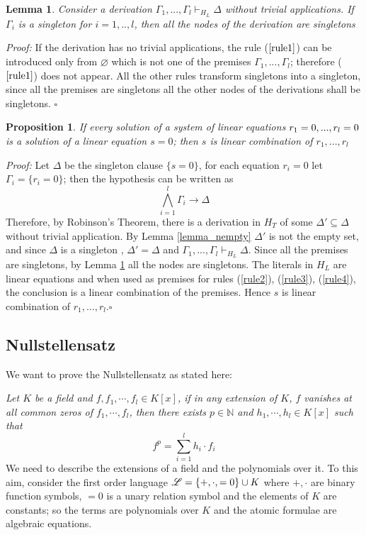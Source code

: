 \documentclass[a4paper,12pt,oneside]{book}
\newtheorem{proposition}[theorem]{Proposition}
\newtheorem{lemma}[theorem]{Lemma}
\newcommand*{\QED}{\hfill\ensuremath{\square}}
\let\emptyset\varnothing
\begin{document}
\begin{lemma}\label{lemma_onlysingletons}
Consider a derivation $\Gamma_1,...,\Gamma_l \vdash_{H_L} \Delta $ without trivial applications. 
If $\Gamma_i$ is a singleton for $i=1,..,l$, then all the nodes of the derivation are singletons
\end{lemma}
\textit{Proof:} If the derivation has no trivial applications, the rule ($\ref{rule1}$) can be introduced only from $\emptyset$ which is not one of the premises $\Gamma_1,...,\Gamma_l$; therefore ($\ref{rule1}$)  does not appear. All the other rules transform singletons into a singleton, since all the premises are singletons all the other nodes of the derivations shall be singletons. \QED

\begin{proposition} 
If every solution of a system of linear equations $r_1=0,...,r_l=\nobreak 0$  is a solution of a linear equation $s=0$; then $s$ is linear combination of $r_1,...,r_l$
\end{proposition}

\textit{Proof:} Let $\Delta$ be the singleton clause $\{s=0\}$, for each equation $r_i=0$  let $\Gamma_i=\{r_i=0\}$; then the hypothesis can be written as
$$ \bigwedge_{i=1}^l \Gamma_i \rightarrow \Delta $$
Therefore, by Robinson's Theorem, there is a derivation in $H_T$ of some $\Delta' \subseteq\Delta$ without trivial application. By Lemma \ref{lemma_nempty} $\Delta'$ is not the empty set,  and  since $\Delta$ is a singleton , $\Delta'=\Delta$ and $ \Gamma_1,...,\Gamma_l \vdash_{H_L} \Delta  $.
Since all the premises are singletons, by Lemma \ref{lemma_onlysingletons} all the nodes are singletons. The literals in $H_L$ are linear equations and when used as premises for rules (\ref{rule2}), (\ref{rule3}), (\ref{rule4}), the conclusion is a linear combination of the premises. 
Hence $s$ is linear combination of $r_1,...,r_l$.\QED


\subsection*{Nullstellensatz} \label{null}


We want to prove the Nullstellensatz as stated here:

\noindent\textit{Let $K$ be a field and $f,f_1,\cdots, f_l \in K[{x}]$, if in any extension of $K$, $f$ vanishes at all common zeros of $f_1,\cdots, f_l$, then there exists $p\in \mathbb{N}$ and $h_1,\cdots, h_l \in K[{x}]$ such that} 
$$
f^p = \sum_{i=1}^l h_i \cdot f_i
$$
We need to describe the extensions of a field and the polynomials over it. To this aim, consider the first order language $\mathscr{L}=\{+,\cdot,=\nobreak 0\}\cup\nobreak K$ where $+,\cdot$ are binary function symbols, $=0$ is a unary relation symbol and the elements of $K$ are constants; so the terms are polynomials over $K$ and the atomic formulae are algebraic equations.
\end{document}
